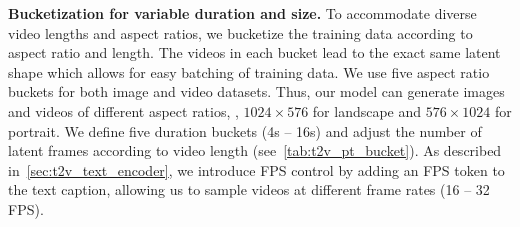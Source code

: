 \begin{table}[!t]
    \centering
    \caption{\textbf{Duration buckets for the \textToVShort pre-training datasets.}
    We split our training videos into five buckets based on their duration and FPS.
    Videos in each bucket have the same number of latent frames which allows for easy batching of training data.
    The buckets for the last three rows are based on the original duration of the video clips.
    The buckets for the first two rows are created based on middle clips sampled from videos of $10.67$-$12$ seconds and $\geq$ 16 seconds respectively.
    }
    \label{tab:t2v_pt_bucket}
\end{table}

\noindent \textbf{Bucketization for variable duration and size.}
To accommodate diverse video lengths and aspect ratios, we bucketize the training data according to aspect ratio and length.
The videos in each bucket lead to the exact same latent shape which allows for easy batching of training data.
We use five aspect ratio buckets for both image and video datasets.
Thus, our model can generate images and videos of different aspect ratios, \eg, $1024 \times 576$ for landscape and $576 \times 1024$ for portrait.
We define five duration buckets (4s -- 16s) and adjust the number of latent frames according to video length (see~\cref{tab:t2v_pt_bucket}).
As described in~\cref{sec:t2v_text_encoder}, we introduce FPS control by adding an FPS token to the text caption, allowing us to sample videos at different frame rates (16 -- 32 FPS).

